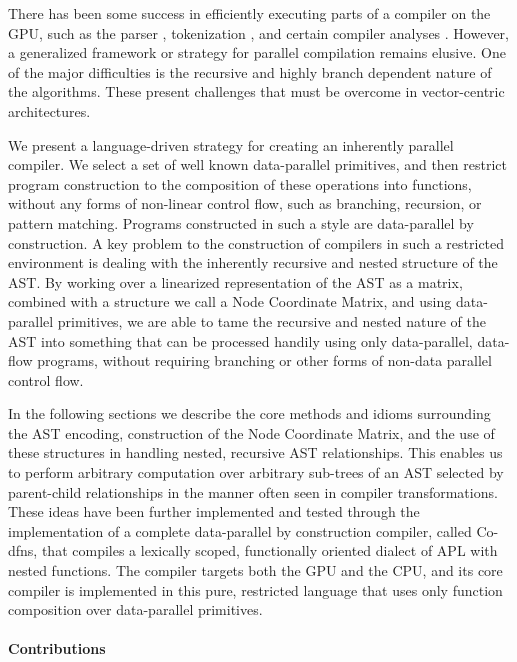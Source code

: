 \documentclass[numbers,preprint]{sigplanconf}
\begin{document}
There has been some success in efficiently executing parts of a compiler 
on the GPU, such as the parser \cite{bunda1984apl}, 
tokenization \cite{bernecky2003tokenizer}, and certain compiler 
analyses \cite{prabhu2011eigencfa,mendez2012inclusion}. However, a generalized 
framework or strategy for parallel compilation remains elusive. One of 
the major difficulties is the recursive and highly branch dependent nature 
of the algorithms. These present challenges that must be overcome in 
vector-centric architectures. 

We present a language-driven strategy for creating an inherently parallel 
compiler. We select a set of well known data-parallel primitives, and then 
restrict program construction to the composition of these operations into 
functions, without any forms of non-linear control flow, such as branching, 
recursion, or pattern matching. Programs constructed in such a style are 
data-parallel by construction. A key problem to the construction of compilers 
in such a restricted environment is dealing with the inherently recursive and 
nested structure of the AST. By working over a linearized representation of 
the AST as a matrix, combined with a structure we call a Node Coordinate 
Matrix, and using data-parallel primitives, we are able to tame the recursive 
and nested nature of the AST into something that can be processed handily 
using only data-parallel, data-flow programs, without requiring branching 
or other forms of non-data parallel control flow. 

In the following sections we describe the core methods and idioms surrounding 
the AST encoding, construction of the Node Coordinate Matrix, and the use 
of these structures in handling nested, recursive AST relationships. This 
enables us to perform arbitrary computation over arbitrary sub-trees of an 
AST selected by parent-child relationships in the manner often seen in 
compiler transformations. These ideas have been further implemented and tested 
through the implementation of a complete data-parallel by construction 
compiler, called Co-dfns, that compiles a lexically scoped, functionally 
oriented dialect of APL with nested functions. 
\cite{hsu2014co,hsu2015accelerating}
The compiler targets both the
GPU and the CPU, and its core compiler is implemented in this pure, restricted 
language that uses only function composition over data-parallel primitives. 

\paragraph{Contributions}
\end{document}
